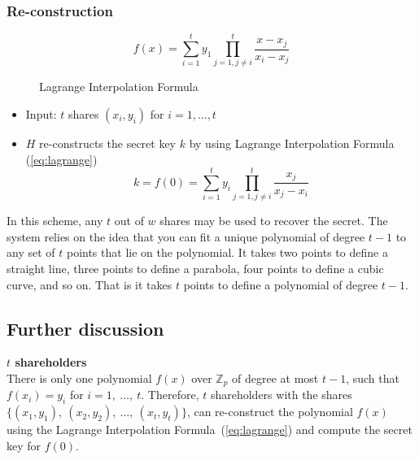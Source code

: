 \subsubsection*{Re-construction}
\begin{figure}[H]
  \begin{equation}\label{eq:lagrange}
    f(x) = \sum\limits_{i=1}^t y_1 \prod\limits_{j=1, j\not=i}^t \frac{x-x_j}{x_i-x_j}
  \end{equation}
  \caption{Lagrange Interpolation Formula}
\end{figure}

\begin{itemize}
\item Input: $t$ shares $(x_i, y_i)$ for $i = 1, \ldots, t$
\item $H$ re-constructs the secret key $k$ by using Lagrange Interpolation Formula (\ref{eq:lagrange})
  \[ k = f(0) = \sum\limits_{i=1}^t y_i \prod\limits_{j=1, j\not=i}^t \frac{x_j}{x_j-x_i} \]
\end{itemize}

In this scheme, any $t$ out of $w$ shares may be used to recover the
secret. The system relies on the idea that you can fit a unique
polynomial of degree $t-1$ to any set of $t$ points that lie on the
polynomial. It takes two points to define a straight line, three
points to define a parabola, four points to define a cubic
curve, and so on. That is it takes $t$ points to define a polynomial
of degree $t-1$.

\subsection{Further discussion}
\textbf{$t$ shareholders} \\
There is only one polynomial $f(x)$ over $\mathbb{Z}_p$ of degree at
most $t-1$, such that $f(x_i) = y_i$ for $i = 1,\ \dots,\
t$. Therefore, $t$ shareholders with the shares $\{(x_1,y_1),\
(x_2,y_2),\ \ldots,\ (x_t,y_t)\}$, can re-construct the polynomial
$f(x)$ using the Lagrange Interpolation Formula~(\ref{eq:lagrange}) and
compute the secret key for $f(0)$.

